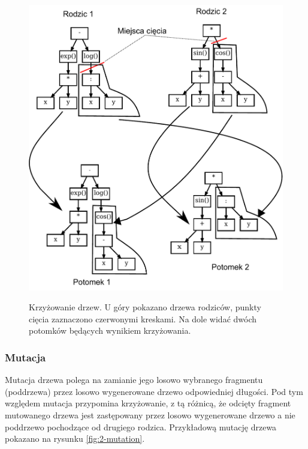 \begin{figure}[h]
\centering
\includegraphics[scale=0.8]{figures/graphs/2-cross-both}
\label{fig:2-cross}
\caption{Krzyżowanie drzew. U góry pokazano drzewa rodziców, punkty cięcia zaznaczono czerwonymi kreskami. Na dole widać dwóch potomków będących wynikiem krzyżowania.}
\end{figure}

\subsubsection{Mutacja}
Mutacja drzewa polega na zamianie jego losowo wybranego fragmentu (poddrzewa) przez losowo wygenerowane drzewo odpowiedniej długości. Pod tym względem mutacja przypomina krzyżowanie, z tą różnicą, że odcięty fragment mutowanego drzewa jest zastępowany przez losowo wygenerowane drzewo a nie poddrzewo pochodzące od drugiego rodzica. Przykładową mutację drzewa pokazano na rysunku \ref{fig:2-mutation}.

